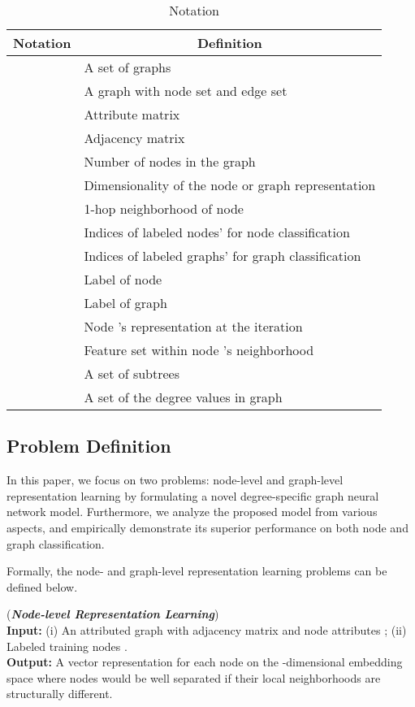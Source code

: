 \documentclass[sigconf]{acmart}
\begin{document}
\begin{table}[t]
\centering
\small
\caption{Notation} \label{tab: notations}
\begin{tabular}{|c|l|}
\hline
\multicolumn{1}{|c|}{Notation} & \multicolumn{1}{c|}{Definition}         \\ \hline
 &  A set of graphs \\ \hline
 & A graph  with node set  and edge set  \\ \hline
 & Attribute matrix \\ \hline
 & Adjacency matrix \\ \hline
 & Number of nodes in the graph \\ \hline
 & Dimensionality of the node or graph representation \\ \hline
 & 1-hop neighborhood of node  \\ \hline
 & Indices of labeled nodes' for node classification \\ \hline
 & Indices of labeled graphs' for graph classification \\ \hline
 & Label of node  \\ \hline
 & Label of graph  \\ \hline
 & Node 's representation at the  iteration\\ \hline
 & Feature set within node 's neighborhood \\  \hline
 & A set of subtrees\\ \hline
 &  A set of the degree values in graph  \\ \hline
\end{tabular}
\vspace{-3mm}
\end{table}

\subsection{Problem Definition}
In this paper, we focus on two problems: node-level and graph-level representation learning by formulating a novel degree-specific graph neural network model. Furthermore, we analyze the proposed model from various aspects, and empirically demonstrate its superior performance on both node and graph classification.

Formally, the node- and graph-level representation learning problems can be defined below.
\begin{definition}(\textit{\textbf{Node-level Representation Learning}}) \\
\indent \textbf{Input:} (i) An attributed graph  with adjacency matrix  and node attributes ; (ii) Labeled training nodes . \\
\indent \textbf{Output:} A vector representation  for each node  on the -dimensional embedding space where nodes would be well separated if their local neighborhoods are structurally different.
\end{definition}
\end{document}
